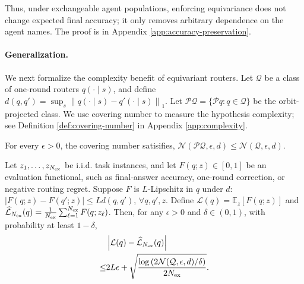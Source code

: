 Thus, under exchangeable agent populations, enforcing equivariance does not
change expected final accuracy; it only removes arbitrary dependence on the agent
names. The proof is in Appendix \ref{app:accuracy-preservation}.

\paragraph{Generalization.}
We next formalize the complexity benefit of equivariant routers. Let
$\mathcal Q$ be a class of one-round routers $q(\cdot\mid s)$, and define
\(
    d(q,q')
    =
    \sup_s
    \left\|
    q(\cdot\mid s)-q'(\cdot\mid s)
    \right\|_1 
\).
Let
\(
    \mathcal P\mathcal Q=\{\mathcal Pq:q\in\mathcal Q\}
\)
be the orbit-projected class. We use covering number to measure the hypothesis complexity; see Definition \ref{def:covering-number} in Appendix \ref{app:complexity}.



\begin{lemma}
\label{lem:covering-projection}
For every $\epsilon>0$, the covering number satisifies,
\(
    \mathcal N(\mathcal P\mathcal Q,\epsilon,d)
    \le
    \mathcal N(\mathcal Q,\epsilon,d)
\).
\end{lemma}

\begin{theorem}
\label{thm:generalization}
Let $z_1,\ldots,z_{N_{\rm ex}}$ be i.i.d. task instances, and let
$F(q;z)\in[0,1]$ be an evaluation functional, such as final-answer accuracy,
one-round correction, or negative routing regret. Suppose $F$ is
$L$-Lipschitz in $q$ under $d$:
\(
    |F(q;z)-F(q';z)|\le Ld(q,q')\),
\(    \forall q,q',z 
\).
Define
\(
    \mathcal L(q)=\mathbb E_z[F(q;z)]\) and
\(    \widehat{\mathcal L}_{N_{\rm ex}}(q)
    =
    \frac{1}{N_{\rm ex}}
    \sum_{\ell=1}^{N_{\rm ex}}F(q;z_\ell)\).
Then, for any $\epsilon>0$ and $\delta\in(0,1)$, with probability at least
$1-\delta$,
\begin{align*}    
&\left|
\mathcal L(q)-\widehat{\mathcal L}_{N_{\rm ex}}(q)
\right|\\
\le&
2L\epsilon
+
\sqrt{
\frac{
\log\left(2\mathcal N(\mathcal Q,\epsilon,d)/\delta\right)
}{
2N_{\rm ex}
}}
.
\end{align*}
\end{theorem}

